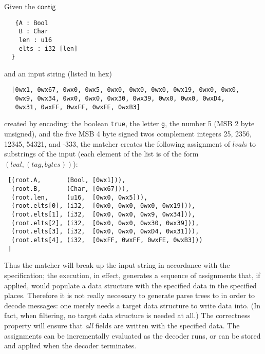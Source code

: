 \documentclass[svgnames]{llncs}
\newcommand{\konst}[1]{\ensuremath{\mathsf{#1}}}
\begin{document}
\begin{example}
Given the \konst{contig}
\begin{verbatim}
   {A : Bool
    B : Char
    len : u16
    elts : i32 [len]
  }
\end{verbatim}
\noindent and an input string (listed in hex)
\begin{verbatim}
  [0wx1, 0wx67, 0wx0, 0wx5, 0wx0, 0wx0, 0wx0, 0wx19, 0wx0, 0wx0,
   0wx9, 0wx34, 0wx0, 0wx0, 0wx30, 0wx39, 0wx0, 0wx0, 0wxD4,
   0wx31, 0wxFF, 0wxFF, 0wxFE, 0wxB3]
\end{verbatim}
created by encoding: the boolean \verb+true+, the letter \verb+g+, the
number 5 (MSB 2 byte unsigned), and the five MSB 4 byte signed twos complement
integers 25, 2356, 12345, 54321, and -333, the matcher creates the
following assignment of $\mathit{lval}$s to substrings of the input
(each element of the list is of the form
$(\mathit{lval}, (\mathit{tag},\mathit{bytes}))$):

\begin{verbatim}
 [(root.A,       (Bool, [0wx1])),
  (root.B,       (Char, [0wx67])),
  (root.len,     (u16,  [0wx0, 0wx5])),
  (root.elts[0], (i32,  [0wx0, 0wx0, 0wx0, 0wx19])),
  (root.elts[1], (i32,  [0wx0, 0wx0, 0wx9, 0wx34])),
  (root.elts[2], (i32,  [0wx0, 0wx0, 0wx30, 0wx39])),
  (root.elts[3], (i32,  [0wx0, 0wx0, 0wxD4, 0wx31])),
  (root.elts[4], (i32,  [0wxFF, 0wxFF, 0wxFE, 0wxB3]))
 ]
\end{verbatim}

\end{example}

Thus the matcher will break up the input string in accordance with the
specification; the execution, in effect, generates a sequence of
assignments that, if applied, would populate a data structure with the
specified data in the specified places. Therefore it is not really
necessary to generate parse trees to in order to decode messages: one
merely needs a target data structure to write data into. (In fact,
when filtering, no target data structure is needed at all.) The
correctness property will ensure that \emph{all} fields are written
with the specified data. The assignments can be incrementally
evaluated as the decoder runs, or can be stored and applied when the
decoder terminates.
\end{document}
